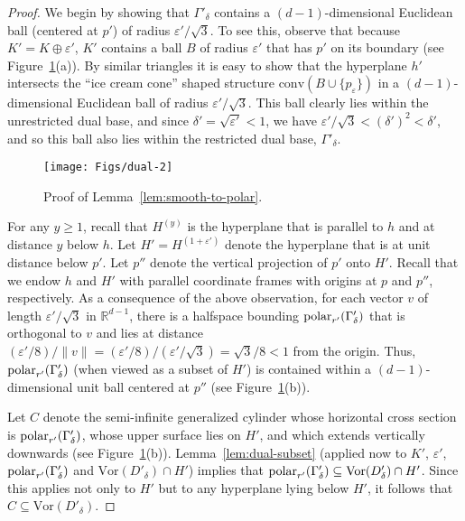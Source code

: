\documentclass[11pt]{article}   \usepackage[letterpaper,hmargin=2.1cm,vmargin=3cm]{geometry}
\newcommand{\RE}{\mathbb{R}}    \newcommand{\ZZ}{\mathbb{Z}}    \newcommand{\eps}{\varepsilon}  \newcommand{\ST}{\,:\,}         \newcommand{\sq}{\square}
\newcommand{\conv}{\mathrm{conv}}
\newcommand{\Vor}{\mathrm{Vor}}
\begin{document}
{\SmoothToPolarStmt*}
\begin{proof}
We begin by showing that $\Gamma'_{\delta}$ contains a $(d-1)$-dimensional Euclidean ball (centered at $p'$) of radius $\eps'/\sqrt{3}$. To see this, observe that because $K' = K \oplus \eps'$, $K'$ contains a ball $B$ of radius $\eps'$ that has $p'$ on its boundary (see Figure~\ref{fig:dual-2}(a)). By similar triangles it is easy to show that the hyperplane $h'$ intersects the ``ice cream cone'' shaped structure $\conv(B \cup \{p_{\eps}\})$ in a $(d-1)$-dimensional Euclidean ball of radius $\eps'/\sqrt{3}$.  This ball clearly lies within the unrestricted dual base, and since $\delta' = \sqrt{\eps'} < 1$, we have $\eps'/\sqrt{3} < (\delta')^2 < \delta'$, and so this ball also lies within the restricted dual base, $\Gamma'_{\delta}$.

\begin{figure}[htbp]
  \centerline{\texttt{[image: Figs/dual-2]}}
  \caption{Proof of Lemma~\ref{lem:smooth-to-polar}.}
  \label{fig:dual-2}
\end{figure}


For any $y \ge 1$, recall that $H^{(y)}$ is the hyperplane that is parallel to $h$ and at distance $y$ below $h$. Let $H' = H^{(1+\eps')}$ denote the hyperplane that is at unit distance below $p'$. Let $p''$ denote the vertical projection of $p'$ onto $H'$. Recall that we endow $h$ and $H'$ with parallel coordinate frames with origins at $p$ and $p''$, respectively. As a consequence of the above observation, for each vector $v$ of length $\eps'/\sqrt{3}$ in $\RE^{d-1}$, there is a halfspace bounding $\mathrm{polar}_{r'}(\Gamma'_{\delta})$ that is orthogonal to $v$ and lies at distance $(\eps'/8)/\|v\| = (\eps'/8)/(\eps'/\sqrt{3}) = \sqrt{3}/8 < 1$ from the origin. Thus, $\mathrm{polar}_{r'}(\Gamma'_{\delta})$ (when viewed as a subset of $H'$) is contained within a $(d-1)$-dimensional unit ball centered at $p''$ (see Figure~\ref{fig:dual-2}(b)).

Let $C$ denote the semi-infinite generalized cylinder whose horizontal cross section is $\mathrm{polar}_{r'}(\Gamma'_{\delta})$, whose upper surface lies on $H'$, and which extends vertically downwards  (see Figure~\ref{fig:dual-2}(b)). Lemma~\ref{lem:dual-subset} (applied now to $K'$, $\eps'$, $\mathrm{polar}_{r'}(\Gamma'_{\delta})$ and $\Vor(D'_{\delta}) \cap H'$) implies that $\polarX{r'}{\Gamma'_{\delta}} \subseteq \Vor(D'_{\delta}) \cap H'$. Since this applies not only to $H'$ but to any hyperplane lying below $H'$, it follows that $C \subseteq \Vor(D'_{\delta})$.


\end{proof}
\end{document}
